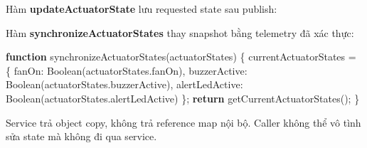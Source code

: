 \documentclass[11pt,oneside,openany]{book}
\newenvironment{Shaded}{\begin{snugshade}}{\end{snugshade}}
\newcommand{\AttributeTok}[1]{\textcolor[rgb]{0.16,0.50,0.73}{#1}}
\newcommand{\BuiltInTok}[1]{\textcolor[rgb]{0.50,0.55,0.55}{#1}}
\newcommand{\ControlFlowTok}[1]{\textcolor[rgb]{0.99,0.74,0.29}{\textbf{#1}}}
\newcommand{\DataTypeTok}[1]{\textcolor[rgb]{0.16,0.50,0.73}{#1}}
\newcommand{\FunctionTok}[1]{\textcolor[rgb]{0.56,0.27,0.68}{#1}}
\newcommand{\KeywordTok}[1]{\textcolor[rgb]{0.81,0.81,0.76}{\textbf{#1}}}
\newcommand{\NormalTok}[1]{\textcolor[rgb]{0.81,0.81,0.76}{#1}}
\newcommand{\OperatorTok}[1]{\textcolor[rgb]{0.81,0.81,0.76}{#1}}
\newcommand{\SpecialCharTok}[1]{\textcolor[rgb]{0.24,0.68,0.91}{#1}}
\newcommand{\VerbatimStringTok}[1]{\textcolor[rgb]{0.85,0.27,0.33}{#1}}
\renewenvironment{Shaded}{%
  \def\FrameCommand{\fboxsep=8pt\colorbox{shadecolor}}%
  \MakeFramed{\advance\hsize-\width\FrameRestore}%
}{\endMakeFramed}
\begin{document}
Hàm \textbf{updateActuatorState} lưu requested state sau publish:

\begin{Shaded}
\end{Shaded}

Hàm \textbf{synchronizeActuatorStates} thay snapshot bằng telemetry đã
xác thực:

\begin{Shaded}
\begin{Highlighting}[]
\KeywordTok{function} \FunctionTok{synchronizeActuatorStates}\NormalTok{(actuatorStates) \{}
\NormalTok{  currentActuatorStates }\OperatorTok{=}\NormalTok{ \{}
    \DataTypeTok{fanOn}\OperatorTok{:} \BuiltInTok{Boolean}\NormalTok{(actuatorStates}\OperatorTok{.}\AttributeTok{fanOn}\NormalTok{)}\OperatorTok{,}
    \DataTypeTok{buzzerActive}\OperatorTok{:} \BuiltInTok{Boolean}\NormalTok{(actuatorStates}\OperatorTok{.}\AttributeTok{buzzerActive}\NormalTok{)}\OperatorTok{,}
    \DataTypeTok{alertLedActive}\OperatorTok{:} \BuiltInTok{Boolean}\NormalTok{(actuatorStates}\OperatorTok{.}\AttributeTok{alertLedActive}\NormalTok{)}
\NormalTok{  \}}\OperatorTok{;}
  \ControlFlowTok{return} \FunctionTok{getCurrentActuatorStates}\NormalTok{()}\OperatorTok{;}
\NormalTok{\}}
\end{Highlighting}
\end{Shaded}

Service trả object copy, không trả reference map nội bộ. Caller không
thể vô tình sửa state mà không đi qua service.
\end{document}
